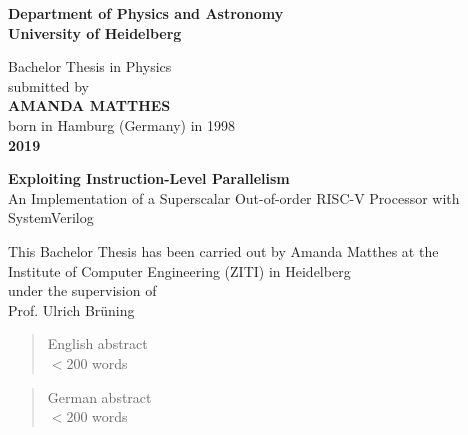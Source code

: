 \documentclass[12pt,a4paper]{article}
\newcommand{\note}{\textcolor{WildStrawberry}}
\begin{document}
\thispagestyle{empty}
\begin{titlepage}
	\begin{center}
		
		\Large\textbf{Department of Physics and Astronomy\\
			University of Heidelberg}
		
		\vspace{17cm}
		
		\normalsize
		Bachelor Thesis in Physics\\
		submitted by\\
		\vspace{0.5cm}
		\Large\textbf{AMANDA MATTHES}\\
		\normalsize
		\vspace{0.5cm}
		born in Hamburg (Germany) in 1998\\
		\vspace{0.5cm}
		\Large\textbf{2019}
		\normalsize
		
		\newpage
		\thispagestyle{empty}
		
		
		
		
		\Large\textbf{Exploiting Instruction-Level Parallelism} \\
		An Implementation of a Superscalar Out-of-order RISC-V Processor with SystemVerilog
		
		\vspace{18cm}
		
		\normalsize
		This Bachelor Thesis has been carried out by Amanda Matthes at the\\
		Institute of Computer Engineering (ZITI) in Heidelberg\\
		under the supervision of\\
		Prof. Ulrich Brüning
		
		\vfill
	\end{center}
	
\end{titlepage}
\newpage 

\thispagestyle{empty}
\begin{abstract}
English abstract\\
\note{$<$200 words}\\
\end{abstract}
\begin{abstract}
German abstract \\
\note{$<$200 words}\\
\end{abstract}
\newpage

\thispagestyle{empty}
\tableofcontents
\newpage
\end{document}
